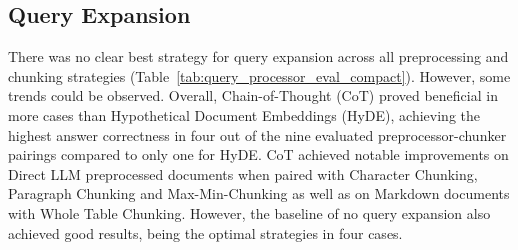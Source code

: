 \documentclass[12pt]{article} %
\begin{document}
\subsection{Query Expansion}
There was no clear best strategy for query expansion across all preprocessing and chunking strategies (Table~\ref{tab:query_processor_eval_compact}). However, some trends could be observed. Overall, Chain-of-Thought (CoT) proved beneficial in more cases than Hypothetical Document Embeddings (HyDE), achieving the highest answer correctness in four out of the nine evaluated preprocessor-chunker pairings compared to only one for HyDE. CoT achieved notable improvements on Direct LLM preprocessed documents when paired with Character Chunking, Paragraph Chunking and Max-Min-Chunking as well as on Markdown documents with Whole Table Chunking. However, the baseline of no query expansion also achieved good results, being the optimal strategies in four cases.
\end{document}
